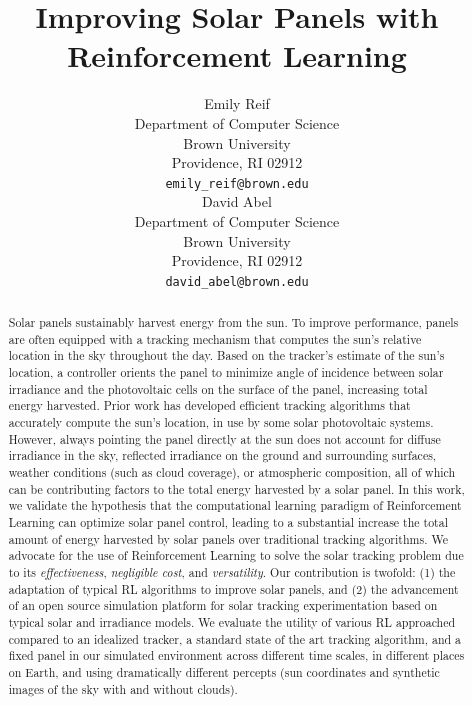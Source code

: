 \documentclass{article}
\title{Improving Solar Panels with Reinforcement Learning}
\author{
Emily Reif \\
Department of Computer Science\\
Brown University\\
Providence, RI 02912 \\
\texttt{emily\_reif@brown.edu} \\
\And
David Abel \\
Department of Computer Science\\
Brown University \\
Providence, RI 02912 \\
\texttt{david\_abel@brown.edu} \\
}
\begin{document}
\maketitle

\begin{abstract}
Solar panels sustainably harvest energy from the sun. To improve performance, panels are often equipped with a tracking mechanism that computes the sun's relative location in the sky throughout the day. Based on the tracker's estimate of the sun's location, a controller orients the panel to minimize angle of incidence between solar irradiance and the photovoltaic cells on the surface of the panel, increasing total energy harvested. Prior work has developed efficient tracking algorithms that accurately compute the sun's location, in use by some solar photovoltaic systems.
%
However, always pointing the panel directly at the sun does not account for diffuse irradiance in the sky, reflected irradiance on the ground and surrounding surfaces, weather conditions (such as cloud coverage), or atmospheric composition, all of which can be contributing factors to the total energy harvested by a solar panel.
%
In this work, we validate the hypothesis that the computational learning paradigm of Reinforcement Learning can optimize solar panel control, leading to a substantial increase the total amount of energy harvested by solar panels over traditional tracking algorithms. We advocate for the use of Reinforcement Learning to solve the solar tracking problem due to its {\it effectiveness}, {\it negligible cost}, and {\it versatility}. Our contribution is twofold: (1) the adaptation of typical RL algorithms to improve solar panels, and (2) the advancement of an open source simulation platform for solar tracking experimentation based on typical solar and irradiance models. We evaluate the utility of various RL approached compared to an idealized tracker, a standard state of the art tracking algorithm, and a fixed panel in our simulated environment across different time scales, in different places on Earth, and using dramatically different percepts (sun coordinates and synthetic images of the sky with and without clouds).
\end{abstract}


\end{document}
